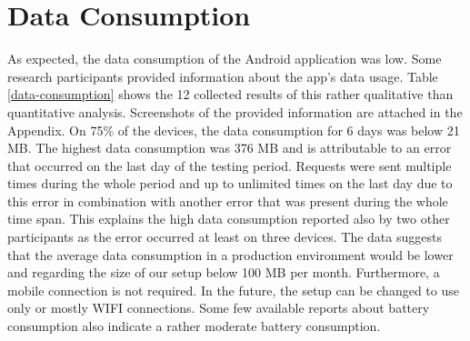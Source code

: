 \section{Data Consumption}
As expected, the data consumption of the Android application was low. Some research participants provided information about the app's data usage. Table \ref{data-consumption} shows the 12 collected results of this rather qualitative than quantitative analysis. Screenshots of the provided information are attached in the Appendix. On 75\% of the devices, the data consumption for 6 days was below 21 MB. The highest data consumption was 376 MB and is attributable to an error that occurred on the last day of the testing period. Requests were sent multiple times during the whole period and up to unlimited times on the last day due to this error in combination with another error that was present during the whole time span. This explains the high data consumption reported also by two other participants as the error occurred at least on three devices. The data suggests that the average data consumption in a production environment would be lower and regarding the size of our setup below 100 MB per month. Furthermore, a mobile connection is not required. In the future, the setup can be changed to use only or mostly WIFI connections.
Some few available reports about battery consumption also indicate a rather moderate battery consumption.

